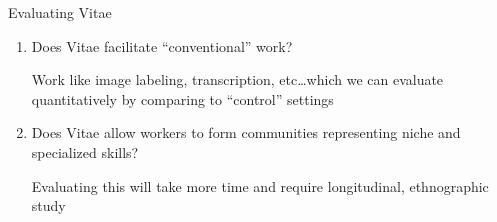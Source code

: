 \documentclass[presentation]{subfiles}
\begin{document}
\begin{frame}{Evaluating Vitae}

  \begin{enumerate}
    \item<+-> Does Vitae facilitate ``conventional'' work?
    
    \small{Work like image labeling, transcription, etc\dots which we can evaluate quantitatively by comparing to ``control'' settings}
    \item<+-> Does Vitae allow workers to form communities representing niche and specialized skills?

    \small{Evaluating this will take more time and require longitudinal, ethnographic study}
  \end{enumerate}
\end{frame}

\end{document}
